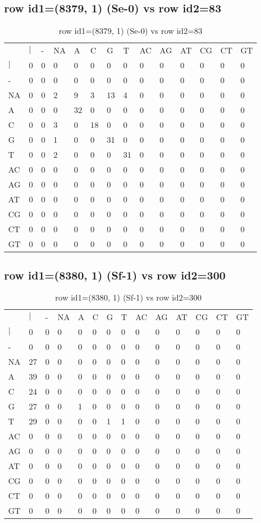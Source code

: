 \subsection{row id1=(8379, 1) (Se-0) vs row id2=83}
\begin{center}
\begin{longtable}{|l|l|l|l|l|l|l|l|l|l|l|l|l|l|}
\caption{row id1=(8379, 1) (Se-0) vs row id2=83} \label{table_dm620}\\
\hline
\\
\hline
&$|$&-&NA&A&C&G&T&AC&AG&AT&CG&CT&GT\\
$|$&0&0&0&0&0&0&0&0&0&0&0&0&0\\
-&0&0&0&0&0&0&0&0&0&0&0&0&0\\
NA&0&0&2&9&3&13&4&0&0&0&0&0&0\\
A&0&0&0&32&0&0&0&0&0&0&0&0&0\\
C&0&0&3&0&18&0&0&0&0&0&0&0&0\\
G&0&0&1&0&0&31&0&0&0&0&0&0&0\\
T&0&0&2&0&0&0&31&0&0&0&0&0&0\\
AC&0&0&0&0&0&0&0&0&0&0&0&0&0\\
AG&0&0&0&0&0&0&0&0&0&0&0&0&0\\
AT&0&0&0&0&0&0&0&0&0&0&0&0&0\\
CG&0&0&0&0&0&0&0&0&0&0&0&0&0\\
CT&0&0&0&0&0&0&0&0&0&0&0&0&0\\
GT&0&0&0&0&0&0&0&0&0&0&0&0&0\\
\hline
\end{longtable}
\end{center}

\subsection{row id1=(8380, 1) (Sf-1) vs row id2=300}
\begin{center}
\begin{longtable}{|l|l|l|l|l|l|l|l|l|l|l|l|l|l|}
\caption{row id1=(8380, 1) (Sf-1) vs row id2=300} \label{table_dm622}\\
\hline
\\
\hline
&$|$&-&NA&A&C&G&T&AC&AG&AT&CG&CT&GT\\
$|$&0&0&0&0&0&0&0&0&0&0&0&0&0\\
-&0&0&0&0&0&0&0&0&0&0&0&0&0\\
NA&27&0&0&0&0&0&0&0&0&0&0&0&0\\
A&39&0&0&0&0&0&0&0&0&0&0&0&0\\
C&24&0&0&0&0&0&0&0&0&0&0&0&0\\
G&27&0&0&1&0&0&0&0&0&0&0&0&0\\
T&29&0&0&0&0&1&1&0&0&0&0&0&0\\
AC&0&0&0&0&0&0&0&0&0&0&0&0&0\\
AG&0&0&0&0&0&0&0&0&0&0&0&0&0\\
AT&0&0&0&0&0&0&0&0&0&0&0&0&0\\
CG&0&0&0&0&0&0&0&0&0&0&0&0&0\\
CT&0&0&0&0&0&0&0&0&0&0&0&0&0\\
GT&0&0&0&0&0&0&0&0&0&0&0&0&0\\
\hline
\end{longtable}
\end{center}

